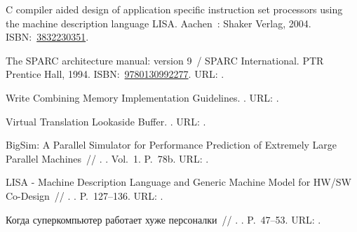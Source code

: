 \begin{thebibliography}{10}
 {C compiler aided design of application specific
  instruction set processors using the machine description language {LISA}}.
  \BibDash
\newblock Aachen~: Shaker Verlag, 2004. \BibDash
\newblock
  ISBN:~\href{http://isbndb.com/search-all.html?kw=3832230351}{3832230351}.

 The {SPARC} architecture manual: version 9~/
  SPARC International. \BibDash
\newblock PTR Prentice Hall, 1994. \BibDash
\newblock
  ISBN:~\href{http://isbndb.com/search-all.html?kw=9780130992277}{9780130992277}.
  \BibDash
\newblock URL: .

{Write Combining Memory Implementation Guidelines}. \BibDash
{}. \BibDash
\newblock URL:
  .

 Virtual Translation Lookaside Buffer. \BibDash
{}. \BibDash
\newblock URL:
  .

 {{BigSim}: A Parallel Simulator
  for Performance Prediction of Extremely Large Parallel Machi\-nes}~//
  \href{http://dx.doi.org/10.1109/IPDPS.2004.1303013}{}. \BibDash
{}. \BibDash
\newblock Vol.~1. \BibDash
\newblock P.~78b. \BibDash
\newblock URL: .

 {{LISA} - Machine Description
  Language and Generic Machine Model for HW/SW Co-Design}~// . \BibDash
{}. \BibDash
\newblock P.~127–136. \BibDash
\newblock URL:
  .

 {Когда
  суперкомпьютер работает хуже
  персоналки}~// . \BibDash
{}. \BibDash
\newblock P.~47–53. \BibDash
\newblock URL: .


\end{thebibliography}
